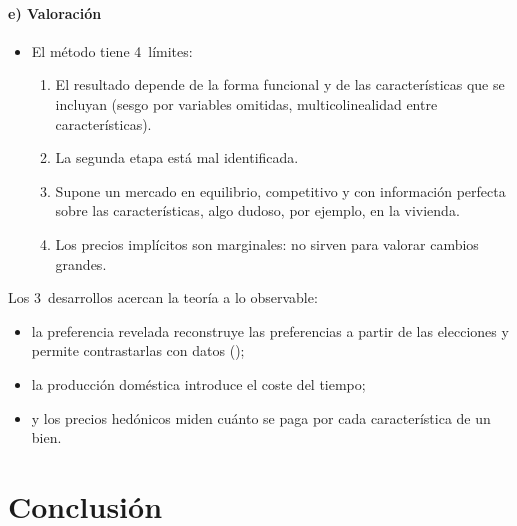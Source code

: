 \documentclass[11pt]{article}
\begin{document}
\paragraph{e) Valoración}

\begin{itemize}
\item El método tiene 4~límites:
\begin{enumerate}
\item El resultado depende de la forma funcional y de las características que se incluyan (sesgo por variables omitidas, multicolinealidad entre características).
\item La segunda etapa está mal identificada.
\item Supone un mercado en equilibrio, competitivo y con información perfecta sobre las características, algo dudoso, por ejemplo, en la vivienda.
\item Los precios implícitos son marginales: no sirven para valorar cambios grandes.
\end{enumerate}
\end{itemize}

\begin{ideaclave}[unbreakable]
Los 3~desarrollos acercan la teoría a lo observable:
\begin{itemize}
\item la preferencia revelada reconstruye las preferencias a partir de las elecciones y permite contrastarlas con datos ();
\item la producción doméstica introduce el coste del tiempo;
\item y los precios hedónicos miden cuánto se paga por cada característica de un bien.
\end{itemize}
\end{ideaclave}

\section*{Conclusión}
\end{document}
